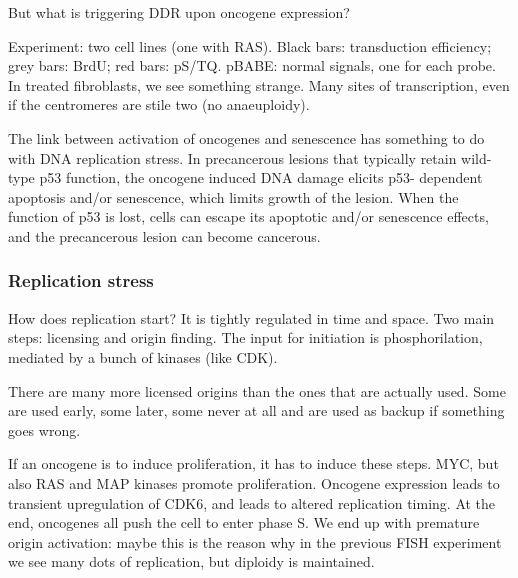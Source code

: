 
But what is triggering DDR upon oncogene expression?

Experiment: two cell lines (one with RAS). Black bars: transduction
efficiency; grey bars: BrdU; red bars: pS/TQ.
pBABE: normal signals, one for each probe. In treated fibroblasts, we
see something strange. Many sites of transcription, even if the
centromeres are stile two (no anaeuploidy).

The link between activation of oncogenes and senescence has something to
do with DNA replication stress. In precancerous lesions that typically
retain wild-type p53 function, the oncogene induced DNA damage elicits
p53- dependent apoptosis and/or senescence, which limits growth of the
lesion. When the function of p53 is lost, cells can escape its apoptotic
and/or senescence effects, and the precancerous lesion can become
cancerous.

\hypertarget{replication-stress}{%
\subsubsection{Replication stress}\label{replication-stress}}

How does replication start? It is tightly regulated in time and space.
Two main steps: licensing and origin finding. The input for initiation
is phosphorilation, mediated by a bunch of kinases (like CDK).

There are many more licensed origins than the ones that are actually
used. Some are used early, some later, some never at all and are used as
backup if something goes wrong.

If an oncogene is to induce proliferation, it has to induce these steps.
MYC, but also RAS and MAP kinases promote proliferation.
Oncogene expression leads to transient upregulation of
CDK6, and leads to altered replication timing. At the end, oncogenes all
push the cell to enter phase S.
We end up with premature origin activation: maybe this is the reason why in
the previous FISH experiment we see many dots of replication, but
diploidy is maintained.

